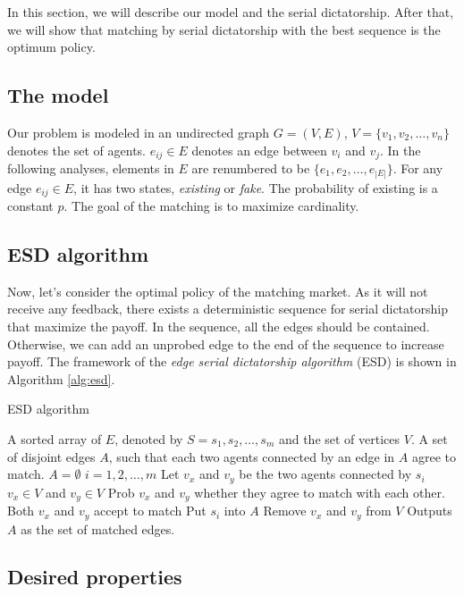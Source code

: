 \documentclass[letterpaper]{article}
\begin{document}
In this section, we will describe our model and the serial dictatorship. After that, we will show that matching by serial dictatorship with the best sequence is the optimum policy.

\subsection{The model}

Our problem is modeled in an undirected graph $G=(V,E)$, $V=\{v_1,v_2,\ldots,v_n\}$ denotes the set of agents. $e_{ij}\in E$ denotes an edge between $v_i$ and $v_j$. In the following analyses, elements in $E$ are renumbered to be $\{e_1,e_2,\ldots,e_{|E|}\}$. 
For any edge $e_{ij}\in E$, it has two states, \textit{existing} or \textit{fake}.
The probability of existing is a constant $p$.
The goal of the matching is to maximize cardinality.


\subsection{ESD algorithm}

Now, let's consider the optimal policy of the matching market.
As it will not receive any feedback, there exists a deterministic sequence for serial dictatorship that maximize the payoff.
In the sequence, all the edges should be contained. Otherwise, we can add an unprobed edge to the end of the sequence to increase payoff.
The framework of the \textit{edge serial dictatorship algorithm} (ESD) is shown in Algorithm \ref{alg:esd}.

\begin{algorithm}
	\caption{ESD algorithm}
	\label{alg:esd}
	\begin{algorithmic}[1]
		\Require
		A sorted array of $E$, denoted by $S=s_1,s_2,\ldots,s_m$ and the set of vertices $V$.
		\Ensure A set of disjoint edges $A$, such that each two agents connected by an edge in $A$ agree to match. 
		\State $A=\emptyset$
		\For $i=1,2,\ldots,m$
		\State Let $v_x$ and $v_y$ be the two agents connected by $s_i$
		\If $v_x\in V$ and $v_y\in V$
		\State Prob $v_x$ and $v_y$ whether they agree to match with each other.
		\If Both $v_x$ and $v_y$ accept to match
		\State Put $s_i$ into $A$
		\State Remove $v_x$ and $v_y$ from $V$
		\EndIf
		\EndIf
		\EndFor
		\State Outputs $A$ as the set of matched edges.
	\end{algorithmic}
\end{algorithm}

\subsection{Desired properties}
\end{document}
